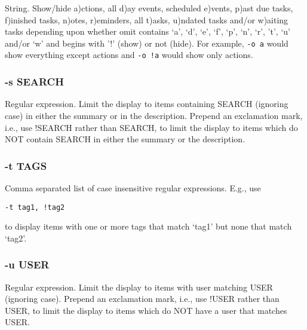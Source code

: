 \documentclass[]{article}
\begin{document}
String. Show/hide a)ctions, all d)ay events, scheduled e)vents, p)ast
due tasks, f)inished tasks, n)otes, r)eminders, all t)asks, u)ndated
tasks and/or w)aiting tasks depending upon whether omit contains `a',
`d', `e', `f', `p', `n', `r', 't', `u' and/or `w' and begins with '!'
(show) or not (hide). For example, \texttt{-o a} would show everything
except actions and \texttt{-o !a} would show only actions.

\subsubsection{-s SEARCH}

Regular expression. Limit the display to items containing SEARCH
(ignoring case) in either the summary or in the description. Prepend an
exclamation mark, i.e., use !SEARCH rather than SEARCH, to limit the
display to items which do NOT contain SEARCH in either the summary or
the description.

\subsubsection{-t TAGS}

Comma separated list of case insensitive regular expressions. E.g., use

\begin{verbatim}
-t tag1, !tag2
\end{verbatim}

to display items with one or more tags that match `tag1' but none that
match `tag2'.

\subsubsection{-u USER}

Regular expression. Limit the display to items with user matching USER
(ignoring case). Prepend an exclamation mark, i.e., use !USER rather
than USER, to limit the display to items which do NOT have a user that
matches USER.
\end{document}
